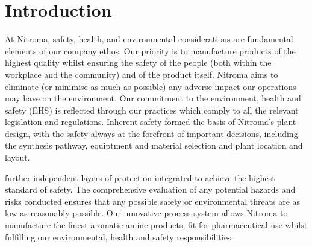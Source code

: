 \section{Introduction}

At Nitroma, safety, health, and environmental considerations are fundamental elements of our company ethos. Our priority is to manufacture products of the highest quality whilst ensuring the safety of the people (both within the workplace and the community) and of the product itself. Nitroma aims to eliminate (or minimise as much as possible) any adverse impact our operations may have on the environment. Our commitment to the environment, health and safety (EHS) is reflected through our practices which comply to all the relevant legislation and regulations. Inherent safety formed the basis of Nitroma’s plant design, with the safety always at the forefront of important decisions, including the synthesis pathway, equiptment and material selection and plant location and layout. 

further independent layers of protection integrated  to achieve the highest standard of safety. The comprehensive evaluation of any potential hazards and risks conducted ensures that any possible safety or environmental threats are as low as reasonably possible. Our innovative process system allows Nitroma to manufacture the finest aromatic amine products, fit for pharmaceutical use whilst fulfilling our environmental, health and safety responsibilities.

